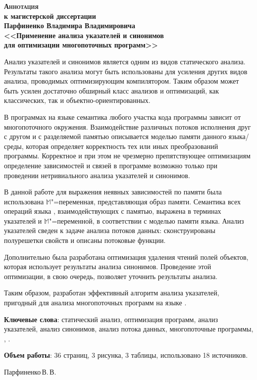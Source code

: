 \documentclass[12pt]{article}
\begin{document}
  \thispagestyle{empty}

  \begin{center}
    \bfseries
    {\Large \scshape Аннотация}\\
    к магистерской диссертации\\
    Парфиненко Владимира Владимировича\\
    {\large
      <<Применение анализа указателей и синонимов\\
      для оптимизации многопоточных программ>>\\
    }
  \end{center}

  Анализ указателей и синонимов является одним из видов статического анализа.
  Результаты такого анализа могут быть использованы для усиления других видов
  анализа, проводимых оптимизирующим компилятором.
  Таким образом может быть усилен достаточно обширный класс анализов и
  оптимизаций, как классических, так и объектно-ориентированных.

  В программах на языке  семантика любого участка кода программы
  зависит от многопоточного окружения.
  Взаимодействие различных потоков исполнения друг с другом и с разделяемой
  памятью описывается моделью памяти данного языка\slash{}среды, которая
  определяет корректность тех или иных преобразований программы.
  Корректное и при этом не чрезмерно препятствующее оптимизациям определение
  зависимостей и связей в программе возможно только при проведении
  нетривиального анализа указателей и синонимов.

  В данной работе для выражения неявных зависимостей по памяти была
  использована $\mathbb{M}$"=переменная, представляющая образ памяти.
  Семантика всех операций языка , взаимодействующих с памятью,
  выражена в терминах указателей и $\mathbb{M}$"=переменной, в соответствии с
  моделью памяти языка.
  Анализ указателей сведен к задаче анализа потоков данных: сконструированы
  полурешетки свойств и описаны потоковые функции.

  Дополнительно была разработана оптимизация удаления чтений полей объектов,
  которая использует результаты анализа синонимов.
  Проведение этой оптимизации, в свою очередь, позволяет уточнить результаты
  анализа.

  Таким образом, разработан эффективный алгоритм анализа указателей, пригодный
  для анализа многопоточных программ на языке .

  \vspace{0.5cm}

  \textbf{Ключевые слова}: статический анализ, оптимизация программ, анализ
  указателей, анализ синонимов, анализ потока данных, многопоточные программы,
  , .

  \textbf{Объем работы}: 36 страниц, 3 рисунка, 3 таблицы, использовано 18
  источников.

  \begin{flushright}
    Парфиненко\,В.\,В.
  \end{flushright}
\end{document}
